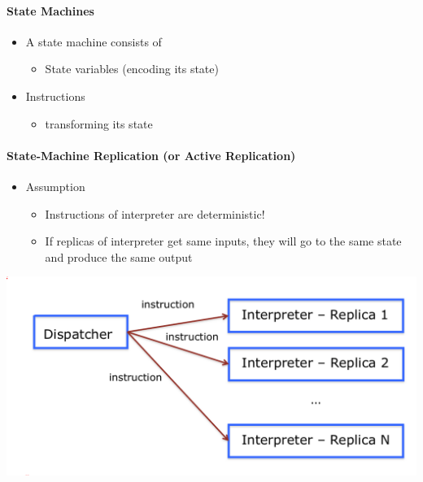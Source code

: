 \paragraph{State Machines}
\begin{itemize}
\item A state machine consists of
  \begin{itemize}
  \item State variables (encoding its state)
  \end{itemize}

\item Instructions
  \begin{itemize}
  \item transforming its state
  \end{itemize}
\end{itemize}


\paragraph{State-Machine Replication (or Active Replication)}
\begin{itemize}
\item Assumption
  \begin{itemize}
  \item Instructions of interpreter are deterministic!
  \item If replicas of interpreter get same inputs, they will go
    to the same state and produce the same output
  \end{itemize}
\end{itemize}

\includegraphics[scale=0.15]{graphics/dispatcher.png}


